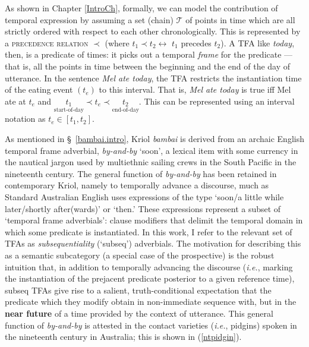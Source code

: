 As shown in Chapter \ref{IntroCh}, formally, we can model the contribution of temporal expression by assuming a set (chain) $\mathcal T$  of points in time which are all strictly ordered with respect to each other chronologically. This is represented by a \textsc{precedence relation} $ \boldsymbol\prec $ (where $t_1\prec t_2\leftrightarrow$ $t_1$ precedes $t_2$). A TFA like \textit{today}, then, is a predicate of times: it picks out a temporal \textit{frame} for the predicate --- that is, all the points in time between the beginning and the end of the day of utterance. In the sentence \textit{Mel ate today}, the TFA restricts the instantiation time of the eating event $(t_e)$ to this interval. That is, \textit{Mel ate today} is true iff Mel ate at $t_e$ and $\underset{\text{start-of-day}}{t_1}\prec t_e\prec\underset{\text{end-of-day}}{t_2}$. This can be represented using an interval notation as $ t_e\in[t_1,t_2] $. %
	
	
As mentioned in §~\ref{bambai.intro}, Kriol \textit{bambai} is derived from an archaic English temporal frame adverbial, \textit{by-and-by} `soon', a lexical item with some currency in the nautical jargon used by multiethnic sailing crews in the South Pacific in the nineteenth century. The general function of \textit{by-and-by} has been retained in contemporary Kriol, namely to temporally advance a discourse, much as Standard Australian English uses expressions of the type `soon/a little while later/shortly after(wards)' or `then.' These expressions represent a subset of `temporal frame adverbials': clause modifiers that delimit the temporal domain in which some predicate is instantiated. In this work, I refer to the relevant set of TFAs as \textit{subsequentiality} ({\sc`subseq'}) adverbials. The motivation for describing this as a semantic subcategory (a special case of the prospective) is the robust intuition that, in addition to temporally advancing the discourse (\textit{i.e.}, marking the instantiation of the prejacent predicate posterior to a given reference time), {\sc subseq} TFAs give rise to a salient, truth-conditional expectation that the predicate which they modify obtain in non-immediate sequence with, but in the \textbf{near future} of a time provided by the context of utterance. This general function of \textit{by-and-by} is attested in the contact varieties (\textit{i.e.}, pidgins) spoken in the nineteenth century in Australia; this is shown in (\ref{ntpidgin}).

